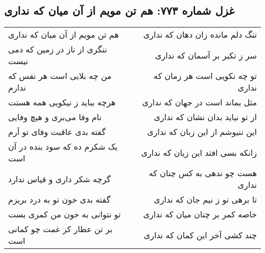 \begin{center}
\section*{غزل شماره ۷۷۳: هم تن مویم از آن میان که نداری}
\label{sec:773}
\begin{longtable}{l p{0.5cm} r}
هم تن مویم از آن میان که نداری
&&
تنگ دلم مانده زان دهان که نداری
\\
ننگری از ناز در زمین که دمی نیست
&&
سر ز تکبر بر آسمان که نداری
\\
من چه بلایی است هر نفس که ندارم
&&
تو چه نکویی است هر زمان که نداری
\\
هرچه بباید ز نیکویی همه هستت
&&
مثل بماند است در جهان که نداری
\\
نام وفا می‌بری و هیچ وفایی
&&
از تو نیاید بدان نشان که نداری
\\
گفته بدی عاقبت وفای تو آرم
&&
این ننیوشم از این زبان که نداری
\\
یک شکرم ده که سود بنده در آن است
&&
زانکه بسی افتد این زیان که نداری
\\
گرچه شکر داری و قیاس ندارد
&&
هست چو ندهی به کس چنان که نداری
\\
گفته بدی خون تو به درد بریزم
&&
تا برهی تو ز نیم جان که نداری
\\
تو نتوانی به خون من کمری بست
&&
خاصه کمر بر چنان میان که نداری
\\
بر تن عطار کز غمت چو کمانی است
&&
چند کشی آخر این کمان که نداری
\\
\end{longtable}
\end{center}
